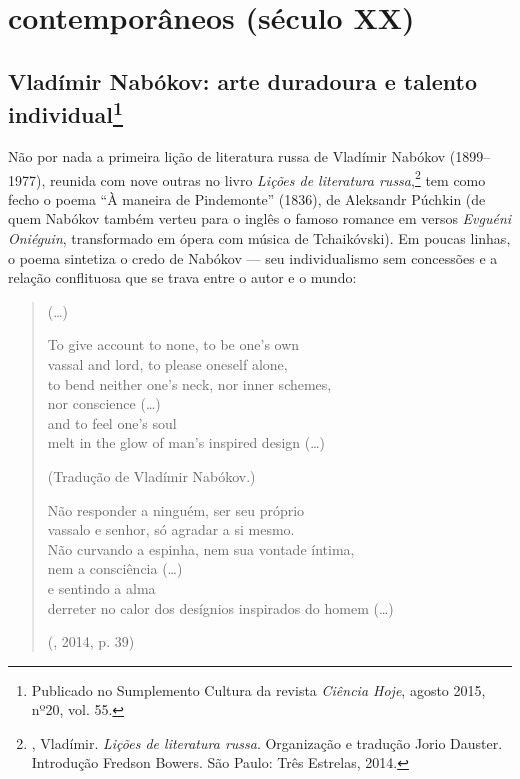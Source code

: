 \part{contemporâneos (século XX)}

\chapter{Vladímir Nabókov: arte duradoura e talento individual\footnote{Publicado no Sumplemento Cultura da revista \emph{Ciência Hoje}, agosto 2015, nº20, vol. 55.}}

Não por nada a primeira lição de literatura russa de Vladímir Nabókov
(1899--1977), reunida com nove outras no livro \emph{Lições de
literatura russa},\footnote{, Vladímir. \emph{Lições de literatura russa}. Organização e tradução Jorio Dauster. Introdução Fredson Bowers. São Paulo: Três Estrelas, 2014.} tem como fecho o poema
``À maneira de Pindemonte'' (1836), de Aleksandr Púchkin (de quem Nabókov
também verteu para o inglês o famoso romance em versos
\emph{Evguéni Oniéguin}, transformado em ópera com música de
Tchaikóvski). Em poucas linhas, o poema sintetiza o credo de Nabókov ---
seu individualismo sem concessões e a relação conflituosa que se trava
entre o autor e o mundo:

\begin{verse}
(\ldots{})

To give account to none, to be one's own \\
vassal and lord, to please oneself alone,\\
to bend neither one's neck, nor inner schemes, \\
nor conscience (\ldots{}) \\
and to feel one's soul \\
melt in the glow of man's inspired design (\ldots{})

(Tradução de Vladímir Nabókov.)

Não responder a ninguém, ser seu próprio \\
vassalo e senhor, só agradar a si mesmo. \\
Não curvando a espinha, nem sua vontade \qb{}íntima, \\
nem a consciência (\ldots{}) \\
e sentindo a alma \\
derreter no calor dos desígnios inspirados \qb{}do homem (\ldots{})

(, 2014, p. 39)
\end{verse}


